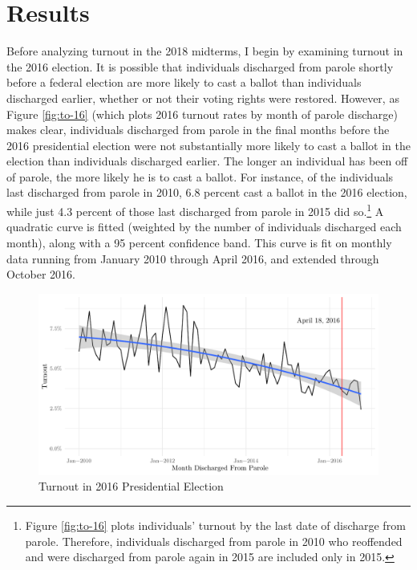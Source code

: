 \documentclass[
  12pt,
]{article}
\begin{document}
\hypertarget{results}{%
\section*{Results}\label{results}}

Before analyzing turnout in the 2018 midterms, I begin by examining turnout in the 2016 election. It is possible that individuals discharged from parole shortly before a federal election are more likely to cast a ballot than individuals discharged earlier, whether or not their voting rights were restored. However, as Figure \ref{fig:to-16} (which plots 2016 turnout rates by month of parole discharge) makes clear, individuals discharged from parole in the final months before the 2016 presidential election were not substantially more likely to cast a ballot in the election than individuals discharged earlier. The longer an individual has been off of parole, the more likely he is to cast a ballot. For instance, of the individuals last discharged from parole in 2010, 6.8 percent cast a ballot in the 2016 election, while just 4.3 percent of those last discharged from parole in 2015 did so.\footnote{Figure \ref{fig:to-16} plots individuals' turnout by the last date of discharge from parole. Therefore, individuals discharged from parole in 2010 who reoffended and were discharged from parole again in 2015 are included only in 2015.} A quadratic curve is fitted (weighted by the number of individuals discharged each month), along with a 95 percent confidence band. This curve is fit on monthly data running from January 2010 through April 2016, and extended through October 2016.

\begin{figure}[H]

{\centering \includegraphics{part2_standalone_files/figure-latex/to-16-chart-1} 

}

\caption{\label{fig:to-16}Turnout in 2016 Presidential Election}\label{fig:to-16-chart}
\end{figure}
\end{document}
